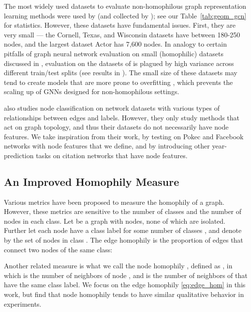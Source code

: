 \documentclass{article}
\begin{document}
The most widely used datasets to evaluate non-homophilous graph representation learning methods were used by \citet{pei2019geom} (and collected by \cite{rozemberczki2019multi,tang2009social, mitchell1997web}); see our Table~\ref{tab:geom_gcn} for statistics. However, these datasets have fundamental issues. First, they are very small --- the Cornell, Texas, and Wisconsin datasets have between 180-250 nodes, and the largest dataset Actor has 7,600 nodes. In analogy to certain pitfalls of graph neural network evaluation on small (homophilic) datasets discussed in \cite{shchur2018pitfalls}, evaluation on the datasets of \citet{pei2019geom} is plagued by high variance across different train/test splits (see results in \cite{zhu2020beyond}). The small size of these datasets may tend to create models that are more prone to overfitting \cite{dwivedi2020benchmarking}, which prevents the scaling up of GNNs designed for non-homophilous settings. 

\citet{peel2017graph} also studies node classification on network datasets with various types of relationships between edges and labels. However, they only study methods that act on graph topology, and thus their datasets do not necessarily have node features. We take inspiration from their work, by testing on Pokec and Facebook networks with node features that we define, and by introducing other year-prediction tasks on citation networks that have node features.

\subsection{An Improved Homophily Measure}\label{sec:new_measure}

Various metrics have been proposed to measure the homophily of a graph. However, these metrics are sensitive to the number of classes and the number of nodes in each class. Let  be a graph with  nodes, none of which are isolated. Further let each node  have a class label  for some number of classes , and denote by  the set of nodes in class . The edge homophily \cite{zhu2020beyond} is the proportion of edges that connect two nodes of the same class:

Another related measure is what we call the node homophily \cite{pei2019geom}, defined as ,
in which  is the number of neighbors of node , and  is the number of neighbors of  that have the same class label. We focus on the edge homophily \eqref{eq:edge_hom} in this work, but find that node homophily tends to have similar qualitative behavior in experiments. 
\end{document}
